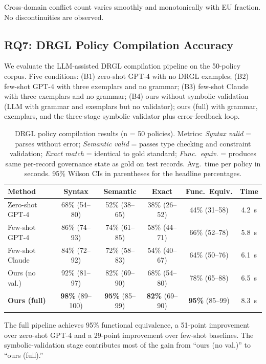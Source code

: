 \documentclass{ieeeaccess}
\begin{document}
Cross-domain conflict count varies smoothly and monotonically with EU fraction. No discontinuities are observed.

\subsection{RQ7: DRGL Policy Compilation Accuracy}

We evaluate the LLM-assisted DRGL compilation pipeline on the 50-policy corpus. Five conditions: (B1) zero-shot GPT-4 with no DRGL examples; (B2) few-shot GPT-4 with three exemplars and no grammar; (B3) few-shot Claude with three exemplars and no grammar; (B4) ours without symbolic validation (LLM with grammar and exemplars but no validator); ours (full) with grammar, exemplars, and the three-stage symbolic validator plus error-feedback loop.

\begin{table}[t]
\centering
\caption{DRGL policy compilation results (n = 50 policies). Metrics: \emph{Syntax valid} = parses without error; \emph{Semantic valid} = passes type checking and constraint validation; \emph{Exact match} = identical to gold standard; \emph{Func.\ equiv.} = produces same per-record governance state as gold on test records. Avg.\ time per policy in seconds. 95\% Wilson CIs in parentheses for the headline percentages.}
\label{tab:drgl_compile}
\begin{tabular}{lccccc}
\hline\hline
Method & Syntax & Semantic & Exact & Func.\ Equiv. & Time \\
\hline
Zero-shot GPT-4 & 68\% (54--80) & 52\% (38--65) & 38\% (26--52) & 44\% (31--58) & 4.2~s \\
Few-shot GPT-4  & 86\% (74--93) & 74\% (61--85) & 58\% (44--71) & 66\% (52--78) & 5.8~s \\
Few-shot Claude & 84\% (72--92) & 72\% (58--83) & 54\% (40--67) & 64\% (50--76) & 6.1~s \\
Ours (no val.)  & 92\% (81--97) & 82\% (69--90) & 68\% (54--80) & 78\% (65--88) & 6.5~s \\
\textbf{Ours (full)} & \textbf{98\%} (89--100) & \textbf{95\%} (85--99) & \textbf{82\%} (69--90) & \textbf{95\%} (85--99) & 8.3~s \\
\hline\hline
\end{tabular}
\end{table}

The full pipeline achieves 95\% functional equivalence, a 51-point improvement over zero-shot GPT-4 and a 29-point improvement over few-shot baselines. The symbolic-validation stage contributes most of the gain from ``ours (no val.)'' to ``ours (full).''
\end{document}
